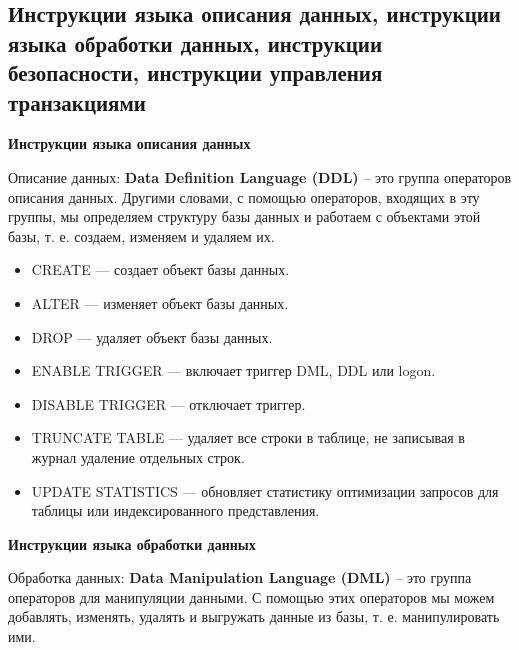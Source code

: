  
\newpage

\subsection{Инструкции языка описания данных, инструкции языка обработки данных, инструкции безопасности, инструкции управления транзакциями}

\textbf{Инструкции языка описания данных}

Описание данных: \textbf{Data Definition Language (DDL)}
– это группа операторов описания данных. Другими словами, с помощью операторов, входящих в эту группы, мы определяем структуру базы данных и работаем с объектами этой базы, т. е. создаем, изменяем и удаляем их.
\begin{itemize}
	\item CREATE — создает объект базы данных. 
	\item ALTER — изменяет объект базы данных.
	\item DROP — удаляет объект базы данных. 
	\item ENABLE TRIGGER — включает триггер DML, DDL или logon. 
	\item DISABLE TRIGGER — отключает триггер. 
	\item TRUNCATE TABLE — удаляет все строки в таблице, не записывая в журнал удаление отдельных строк. 
	\item UPDATE STATISTICS — обновляет статистику оптимизации запросов для таблицы или индексированного представления.
\end{itemize}

\textbf{Инструкции языка обработки данных}

Обработка данных: \textbf{Data Manipulation Language (DML)} – это группа операторов для манипуляции данными. С помощью этих операторов мы можем добавлять, изменять, удалять и выгружать данные из базы, т. е. манипулировать ими.

